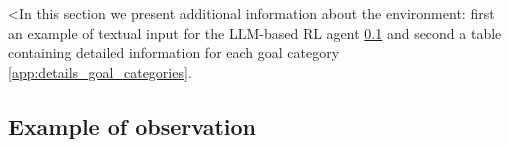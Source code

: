<In this section we present additional information about the environment: first an example of textual input for the LLM-based RL agent \ref{app:zoo_ex_obs} and second a table containing detailed information for each goal category \ref{app:details_goal_categories}.  
\subsection{Example of observation}
\label{app:zoo_ex_obs}

 

